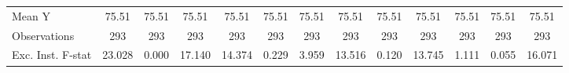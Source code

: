 {\begin{tabular}{l*{12}{c}}
\midrule
Mean Y      &       75.51         &       75.51         &       75.51         &       75.51         &       75.51         &       75.51         &       75.51         &       75.51         &       75.51         &       75.51         &       75.51         &       75.51         \\
Observations&         293         &         293         &         293         &         293         &         293         &         293         &         293         &         293         &         293         &         293         &         293         &         293         \\
Exc. Inst. F-stat&      23.028         &       0.000         &      17.140         &      14.374         &       0.229         &       3.959         &      13.516         &       0.120         &      13.745         &       1.111         &       0.055         &      16.071         \\
\bottomrule
\end{tabular}
}
